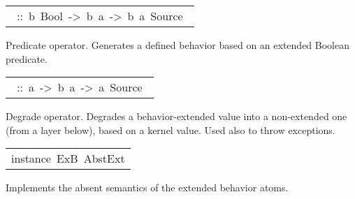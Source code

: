 \begin{haddockdesc}
\begin{haddockdesc}
\item[\begin{tabular}{@{}l}\haddockid{(/\&\textbackslash)}\ ::\ b\ Bool\ ->\ b\ a\ ->\ b\ a\ Source\ \end{tabular}]
\haddockbegindoc
Predicate operator. Generates a defined behavior based on an extended Boolean predicate.\par

\item[\begin{tabular}{@{}l}\haddockid{(/"!\textbackslash)}\ ::\ a\ ->\ b\ a\ ->\ a\ Source\ \end{tabular}]
\haddockbegindoc
Degrade operator. Degrades a behavior-extended value into a non-extended one (from a layer below), based on a kernel value. Used also to throw exceptions.\par

\end{haddockdesc}


\item[\begin{tabular}{@{}l}
instance\ ExB\ AbstExt
\end{tabular}]\haddockbegindoc
Implements the absent semantics of the extended behavior atoms.\par

\end{haddockdesc}
